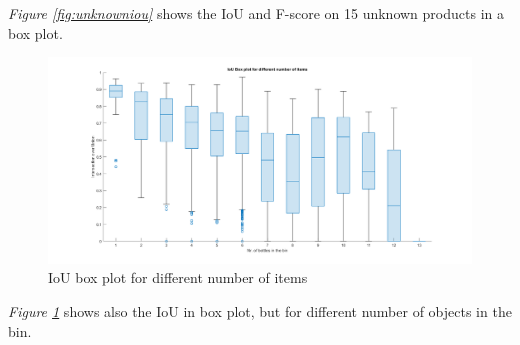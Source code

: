 \textit{Figure \ref{fig:unknowniou}} shows the IoU and F-score on 15 unknown products in a box plot.
\begin{figure}[h]
    \centering
    \includegraphics[width=1\textwidth]{graphics/results/boxplotBottles.png}
    \caption{IoU box plot for different number of items}
    \label{fig:bottles}
\end{figure}

\textit{Figure \ref{fig:bottles}} shows also the IoU in box plot, but for different number of objects in the bin.